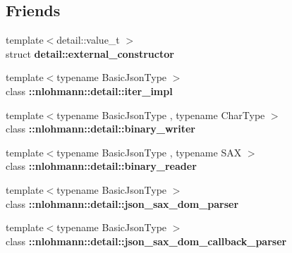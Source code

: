 \subsection*{Friends}
\begin{DoxyCompactItemize}
\item 
\mbox{\label{classnlohmann_1_1basic__json_a6275ed57bae6866cdf5db5370a7ad47c}} 
{\footnotesize template$<$detail\+::value\+\_\+t $>$ }\\struct {\bfseries detail\+::external\+\_\+constructor}
\item 
\mbox{\label{classnlohmann_1_1basic__json_a842e5c7ca096025c18b11e715d3401f4}} 
{\footnotesize template$<$typename Basic\+Json\+Type $>$ }\\class {\bfseries \+::nlohmann\+::detail\+::iter\+\_\+impl}
\item 
\mbox{\label{classnlohmann_1_1basic__json_a69d491bbda88ade6d3c7a2b11309e8bf}} 
{\footnotesize template$<$typename Basic\+Json\+Type , typename Char\+Type $>$ }\\class {\bfseries \+::nlohmann\+::detail\+::binary\+\_\+writer}
\item 
\mbox{\label{classnlohmann_1_1basic__json_a3226693341c251507fec5d6f4fa5ce79}} 
{\footnotesize template$<$typename Basic\+Json\+Type , typename S\+AX $>$ }\\class {\bfseries \+::nlohmann\+::detail\+::binary\+\_\+reader}
\item 
\mbox{\label{classnlohmann_1_1basic__json_a47aabb1eceae32e8a6e8e7f0ff34be60}} 
{\footnotesize template$<$typename Basic\+Json\+Type $>$ }\\class {\bfseries \+::nlohmann\+::detail\+::json\+\_\+sax\+\_\+dom\+\_\+parser}
\item 
\mbox{\label{classnlohmann_1_1basic__json_a95574da8d12905ea99dc348934c837da}} 
{\footnotesize template$<$typename Basic\+Json\+Type $>$ }\\class {\bfseries \+::nlohmann\+::detail\+::json\+\_\+sax\+\_\+dom\+\_\+callback\+\_\+parser}
\end{DoxyCompactItemize}
